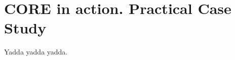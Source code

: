 \section{CORE in action. Practical Case Study}
\label{sec:corepracticalcasestudy}

Yadda yadda yadda.

